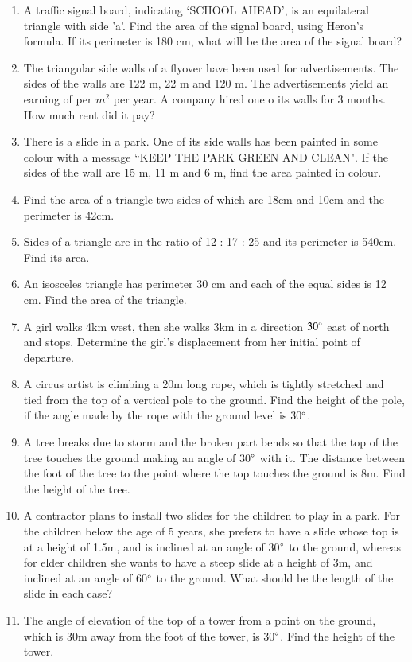 \begin{enumerate}[label=\arabic*.,ref=\thesubsection.\theenumi]
\item A traffic signal board, indicating ‘SCHOOL AHEAD’, is an equilateral triangle with side 'a'. Find the area of the signal board, using Heron's formula. If its perimeter is 180 cm, what will be the area of the signal board?
\item The triangular side walls of a flyover have been used for advertisements. The sides of the walls are 122 m, 22 m and 120 m. The advertisements yield an earning of  per $m^2$ per year.  A company hired one o its walls for 3 months. How  much rent did it pay?
\item There is a slide in a park. One of its side walls has been painted in some colour with a message ``KEEP THE PARK GREEN AND CLEAN". If the sides of the wall are 15 m, 11 m and 6 m, find the area painted in colour.
\item Find the area of a triangle two sides of which are 18cm and 10cm and the perimeter is 42cm.
\item Sides of a triangle are in the ratio of 12 : 17 : 25 and its perimeter is 540cm. Find its area. 
\item  An isosceles triangle has perimeter 30 cm and each of the equal sides is 12 cm. Find the area of the triangle.
\item A girl walks 4km west, then she walks 3km in a direction $30\degree$ east of north and stops.  Determine the girl's displacement from her initial point of departure.
%
\item A circus artist is climbing a 20m long rope, which is tightly stretched and tied from the top of a vertical pole to the ground.  Find the height of the pole, if the angle made by the rope with the ground level is 30$\degree$.
%
\item A tree breaks due to storm and the broken part bends so that the top of the tree touches the ground making an angle of 30$\degree$ with it.  The distance between the foot of the tree to the point where the top touches the ground is 8m.  Find the height of the tree.
%
\item A contractor plans to install two slides for the children to play in a park.  For the children below the age of 5 years, she prefers to have a slide whose top is at a height of 1.5m, and is inclined at an angle of 30$\degree$  to the ground, whereas for elder children she wants to have a steep slide at a height of 3m, and inclined at an angle of 60$\degree$ to the ground.  What should be the length of the slide in each case?
%
\item The angle of elevation of the top of a tower from a point on the ground, which is 30m away from the foot of the tower, is 30$\degree$.  Find the height of the tower.

\end{enumerate}
